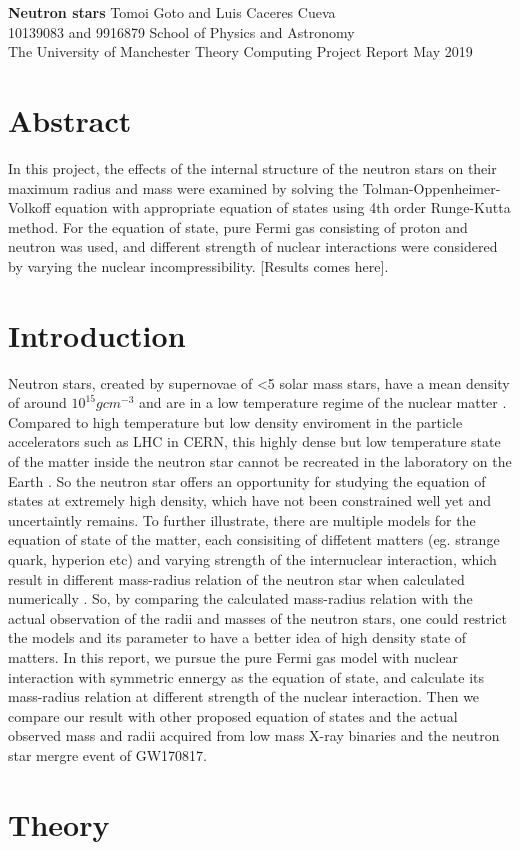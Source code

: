 \documentclass[draft,11pt]{article}
\theoremstyle{definition}
\theoremstyle{remark}
\newcommand{\makecover}[5]{
\thispagestyle{empty}
\setcounter{page}{0}
\begin{center}\LARGE{\bf #1}\vskip 24pt \normalsize{#2}\hspace*{\fill}\\
#3\vskip 12pt School of Physics and Astronomy\\The University of Manchester\vskip 12pt Theory Computing Project Report\vskip 12pt #4\end{center}\vskip 54pt

\section*{Abstract}
#5
\newpage}
\begin{document}
    \makecover
    {Neutron stars}
    {Tomoi Goto and Luis Caceres Cueva}
    {10139083 and 9916879}
    {May 2019}
    {In this project, the effects of the internal structure of the neutron stars on their maximum radius and mass were examined by solving the Tolman-Oppenheimer-Volkoff equation with appropriate equation of states using 4th order Runge-Kutta method. For the equation of state, pure Fermi gas consisting of proton and neutron was used, and different strength of nuclear interactions were considered by varying the nuclear incompressibility. [Results comes here].}
    
    \section{Introduction}
        Neutron stars, created by supernovae of <5 solar mass stars, have a mean density of around $10^{15} gcm^{-3}$ and are in a low temperature regime of the nuclear matter \cite{shapiro.teukolsky.1983/bh.wd.ns.co}. Compared to high temperature but low density enviroment in the particle accelerators such as LHC in CERN, this highly dense but low temperature state of the matter inside the neutron star cannot be recreated in the laboratory on the Earth \cite{graber.andersson.2017/ns.lab}. So the neutron star offers an opportunity for studying the equation of states at extremely high density, which have not been constrained well yet and uncertaintly remains.  
        To further illustrate, there are multiple models for the equation of state of the matter, each consisiting of diffetent matters (eg. strange quark, hyperion etc) and varying strength of the internuclear interaction, which result in different mass-radius relation of the neutron star when calculated numerically \cite{graber.andersson.2017/ns.lab}. So, by comparing the calculated mass-radius relation with the actual observation of the radii and masses of the neutron stars, one could restrict the models and its parameter to have a better idea of high density state of matters.
        In this report, we pursue the pure Fermi gas model with nuclear interaction with symmetric ennergy as the equation of state, and calculate its mass-radius relation at different strength of the nuclear interaction. Then we compare our result with other proposed equation of states and the actual observed mass and radii acquired from low mass X-ray binaries and the neutron star mergre event of GW170817.
    
    \section{Theory}
\end{document}
